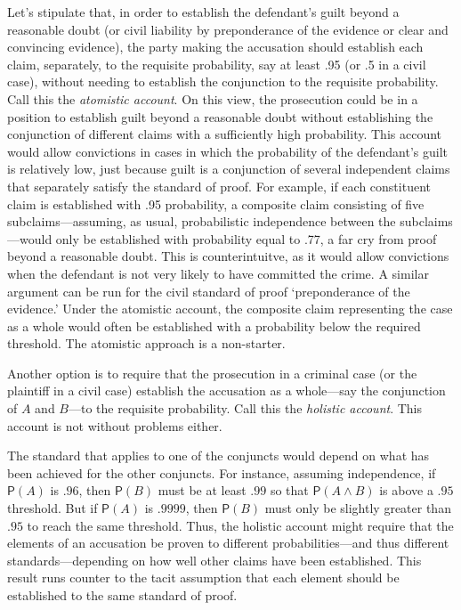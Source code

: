 \documentclass[
  10pt,
  dvipsnames,enabledeprecatedfontcommands]{scrartcl}
\newcommand{\raf}[1]{\todo[color=olive!40]{#1}}
\newcommand{\et}{\wedge}
\newcommand{\pr}[1]{\ensuremath{\mathsf{P}(#1)}}
\begin{document}
Let's stipulate that, in order to establish the defendant's guilt beyond
a reasonable doubt (or civil liability by preponderance of the evidence
or clear and convincing evidence), the party making the accusation
should establish each claim, separately, to the requisite probability,
say at least .95 (or .5 in a civil case), without needing to establish
the conjunction to the requisite probability. Call this the
\textit{atomistic account}. On this view, the prosecution could be in a
position to establish guilt beyond a reasonable doubt without
establishing the conjunction of different claims with a sufficiently
high probability. This account would allow convictions in cases in which
the probability of the defendant's guilt is relatively low, just because
guilt is a conjunction of several independent claims that separately
satisfy the standard of proof. For example, if each constituent claim is
established with .95 probability, a composite claim consisting of five
subclaims---assuming, as usual, probabilistic independence between the
subclaims---would only be established with probability equal to .77, a
far cry from proof beyond a reasonable doubt. This is counterintuitve,
as it would allow convictions when the defendant is not very likely to
have committed the crime. A similar argument can be run for the civil
standard of proof `preponderance of the evidence.' Under the atomistic
account, the composite claim representing the case as a whole would
often be established with a probability below the required threshold.
The atomistic approach is a non-starter.

Another option is to require that the prosecution in a criminal case (or
the plaintiff in a civil case) establish the accusation as a whole---say
the conjunction of \(A\) and \(B\)---to the requisite probability. Call
this the \textit{holistic account}. This account is not without problems
either.

The standard that applies to one of the conjuncts would depend on what
has been achieved for the other conjuncts. For instance, assuming
independence, if \(\pr{A}\) is \(.96\), then \(\pr{B}\) must be at least
\(.99\) so that \(\pr{A\et B}\) is above a \(.95\) threshold. But if
\(\pr{A}\) is \(.9999\), then \(\pr{B}\) must only be slightly greater
than \(.95\) to reach the same threshold. Thus, the holistic account
might require that the elements of an accusation be proven to different
probabilities---and thus different standards---depending on how well
other claims have been established. This result runs counter to the
tacit assumption that each element should be established to the same
standard of proof. \raf{M: Cite Ubaniak's paper on this point.}
\end{document}
